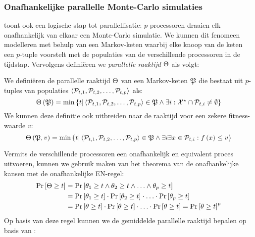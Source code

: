 \subsubsection{Onafhankelijke parallelle Monte-Carlo simulaties}

\cite{DBLP:journals/jc/ShonkwilerV94} toont ook een logische stap tot parallellisatie: $p$ processoren draaien elk onafhankelijk van elkaar een Monte-Carlo simulatie. We kunnen dit fenomeen modelleren met behulp van een Markov-keten waarbij elke knoop van de keten een $p$-tuple voorstelt met de populaties van de verschillende processoren in de tijdstap. Vervolgens defini\"eren we \emph{parallelle raaktijd} $\Theta$ als volgt:

\begin{definition}
We defini\"eren de parallelle raaktijd $\Theta$ van een Markov-keten $\mathfrak{P}$ die bestaat uit $p$-tuples van populaties $\left\langle \mathcal{P}_{t,1},\mathcal{P}_{t,2},\ldots,\mathcal{P}_{t,p}\right\rangle$ als:
\begin{equation}
\Theta\left(\mathfrak{P}\right)=\min\left\{ t|\left\langle \mathcal{P}_{t,1},\mathcal{P}_{t,2},\ldots,\mathcal{P}_{t,p}\right\rangle\in\mathfrak{P}\wedge\exists i:\mathcal{X}^{\star}\cap \mathcal{P}_{t,i}\neq\emptyset\right\}
\end{equation}
We kunnen deze definitie ook uitbreiden naar de raaktijd voor een zekere fitness-waarde $v$:
\begin{equation}
\Theta\left(\mathfrak{P},v\right)=\min\left\{ t|\left\langle \mathcal{P}_{t,1},\mathcal{P}_{t,2},\ldots,\mathcal{P}_{t,p}\right\rangle\in\mathfrak{P}\wedge\exists i\exists x\in\mathcal{P}_{t,i}:f\left(x\right)\leq v\right\}
\end{equation}
\end{definition}
Vermits de verschillende processoren een onafhankelijk en equivalent proces uitvoeren, kunnen we gebruik maken van het theorema van de onafhankelijke kansen met de onafhankelijke EN-regel:
\begin{equation}
\begin{aligned}
\Prob{\phittime\geq t}&=\Prob{\hittime_1\geq t\wedge\hittime_2\geq t\wedge\ldots\wedge\hittime_p\geq t}\\
&=\Prob{\hittime_1\geq t}\cdot\Prob{\hittime_2\geq t}\cdot\ldots\cdot\Prob{\hittime_p\geq t}\\
&=\Prob{\hittime\geq t}\cdot\Prob{\hittime\geq t}\cdot\ldots\cdot\Prob{\hittime\geq t}=\Prob{\hittime\geq t}^p
\end{aligned}
\eqnlab{probabilityPower}
\end{equation}
Op basis van deze regel kunnen we de gemiddelde parallelle raaktijd bepalen op basis van :
